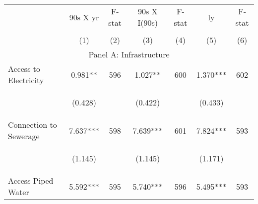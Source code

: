 \begin{tabular}{lcccccc}


\toprule


\multicolumn{1}{l}{} & \multicolumn{1}{c}{90s X yr} & \multicolumn{1}{c}{F-stat} & \multicolumn{1}{c}{90s X I(90s)} & \multicolumn{1}{c}{F-stat} & \multicolumn{1}{c}{ly} & \multicolumn{1}{c}{F-stat}  \\

\cmidrule(l{1mm}r{1mm}){2-3} \cmidrule(l{1mm}r{1mm}){4-5} \cmidrule(l{1mm}r{1mm}){6-7}   \\

 & (1) & (2) & (3) & (4) & (5) & (6)  \\ 
 

\hline

\multicolumn{7}{c}{Panel A: Infrastructure}   \\                                                          

Access to Electricity   	&  0.981**   
				&  596  
				&   1.027**  
				&  600 
				&  1.370***  
				&  602 \\

\vspace{4pt} &  \begin{footnotesize}(0.428)\end{footnotesize}   & &
			    \begin{footnotesize}(0.422)\end{footnotesize}   & &
			    \begin{footnotesize}(0.433)\end{footnotesize}   & \\          


Connection to Sewerage   &  7.637***   &  598  &   7.639***  &  601 &  7.824***  &  593   \\

\vspace{4pt} &  \begin{footnotesize}(1.145)\end{footnotesize}   & &
			    \begin{footnotesize}(1.145)\end{footnotesize}   & &
			    \begin{footnotesize}(1.171)\end{footnotesize}   &
			     \\          


Access Piped Water   &  5.592***   &  595  &   5.740***  &  596 &  5.495***  &  593   \\



\end{tabular}

